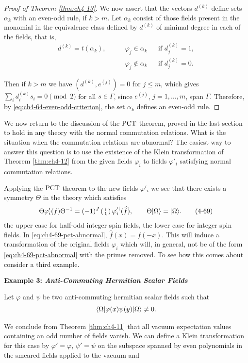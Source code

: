 \begin{proof}[Proof of Theorem \ref{thm:ch4-13}]
We now assert that the vectors $d^{(k)}$ define sets $\alpha_k$ with an
even-odd rule, if $k>m$.  Let $\alpha_k$ consist of those fields present in
the monomial in the equivalence class defined by $d^{(k)}$ of minimal degree in
each of the fields, that is,
\begin{equation*}
\begin{aligned}
  d^{(k)}=t(\alpha_k),\qquad
  &\varphi_j\in\alpha_k &&\text{if }d_j^{(k)}=1,\\
  &\varphi_j\notin\alpha_k &&\text{if }d_j^{(k)}=0.
\end{aligned}
\end{equation*}

Then if $k>m$ we have $(d^{(k)},e^{(j)})=0$ for $j\leq m$, which gives
$\sum_i d_i^{(k)}s_i=0\pmod 2$ for all $s\in\Gamma$, since $e^{(j)}$,
$j=1,\ldots,m$, span $\Gamma$.  Therefore, by \eqref{eq:ch4-64-even-odd-criterion}, the set $\alpha_k$
defines an even-odd rule.
\end{proof}

We now return to the discussion of the $\mathrm{PCT}$ theorem, proved in the last
section to hold in any theory with the normal commutation relations.  What is
the situation when the commutation relations are abnormal?  The easiest way to
answer this question is to use the existence of the Klein transformation of
Theorem \ref{thm:ch4-12} from the given fields $\varphi_i$ to fields $\varphi'_i$
satisfying normal commutation relations.

Applying the $\mathrm{PCT}$ theorem to the new fields $\varphi'_i$ we see that there
exists a symmetry $\Theta$ in the theory which satisfies
\begin{equation}
  \Theta\varphi'_i(f)\Theta^{-1}
  =(-1)^J\left(\begin{smallmatrix}\mathrm{i}\\1\end{smallmatrix}\right)
  \varphi_i^{\prime\dagger}(\widehat f),
  \qquad
  \Theta\lvert \Omega\rangle=\lvert \Omega\rangle.
  \tag{4-69}\label{eq:ch4-69-pct-abnormal}
\end{equation}
the upper case for half-odd integer spin fields, the lower case for integer
spin fields.  In \eqref{eq:ch4-69-pct-abnormal}, $\widehat f(x)=f(-x)$.  This will induce a
transformation of the original fields $\varphi_i$ which will, in general, not
be of the form \eqref{eq:ch4-69-pct-abnormal} with the primes removed.  To see how this comes about
consider a third example.

\par\medskip\noindent\textbf{Example 3: \emph{Anti-Commuting Hermitian Scalar Fields}}
\par\smallskip

Let $\varphi$ and $\psi$ be two anti-commuting hermitian scalar fields such
that
\begin{equation*}
  \langle \Omega\rvert\varphi(x)\psi(y)\lvert \Omega\rangle\ne0.
\end{equation*}

We conclude from Theorem \ref{thm:ch4-11} that all vacuum expectation values containing an
odd number of fields vanish.  We can define a Klein transformation for this
case by $\varphi'=\varphi$, $\psi'=\psi$ on the subspace spanned by even
polynomials in the smeared fields applied to the vacuum and
